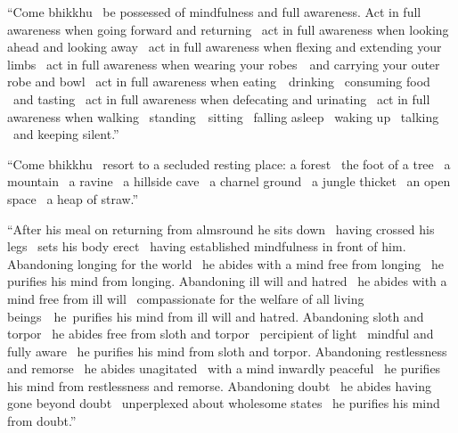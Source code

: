 \begin{english-only-justify}
  ``Come bhikkhu \breathmark\ be possessed of mindfulness and full awareness. Act in full awareness when going forward and returning \breathmark\ act in full awareness when looking ahead and looking away \breathmark\ act in full awareness when flexing and extending your limbs \breathmark\ act in full awareness when wearing your \mbox{robes}~\breathmark\ and carrying your outer robe and bowl \breathmark\ act in full awareness when \mbox{eating}~\breathmark\ drinking \breathmark\ consuming food \breathmark\ and tasting \breathmark\ act in full awareness when defecating and urinating \breathmark\ act in full awareness when walking \breathmark\ \mbox{standing}~\breathmark\ sitting \breathmark\ falling asleep \breathmark\ waking up\makeatletter\hyperlink{endnote60-appendix}\makeatother
  \breathmark\ talking \breathmark\ and keeping silent.''
\end{english-only-justify}

\begin{english-only-justify}
  ``Come bhikkhu \breathmark\ resort to a secluded resting place: a forest \breathmark\ the foot of a tree \breathmark\ a mountain \breathmark\ a ravine \breathmark\ a hillside cave \breathmark\ a charnel ground \breathmark\ a jungle thicket \breathmark\ an open space \breathmark\ a heap of straw.''
\end{english-only-justify}

\begin{english-only-justify}
  ``After his meal on returning from almsround he sits down \breathmark\ having crossed his legs \breathmark\ sets his body erect \breathmark\ having established mindfulness in front of him. Abandoning longing\makeatletter\hyperlink{endnote61-appendix}\makeatother
  for the world \breathmark\ he abides with a mind free from longing \breathmark\ he purifies his mind from longing. Abandoning ill will and hatred \breathmark\ he abides with a mind free from ill will \breathmark\ compassionate for the welfare of all living \mbox{beings}~\breathmark\ he~purifies his mind from ill will and hatred. Abandoning sloth and torpor \breathmark\ he abides free from sloth and torpor \breathmark\ percipient of light \breathmark\ mindful and fully aware \breathmark\ he purifies his mind from sloth and torpor. Abandoning restlessness and remorse \breathmark\ he abides unagitated \breathmark\ with a mind inwardly peaceful \breathmark\ he purifies his mind from restlessness and remorse. Abandoning doubt \breathmark\ he abides having gone beyond doubt \breathmark\ unperplexed about wholesome states \breathmark\ he purifies his mind from doubt.''
\end{english-only-justify}

